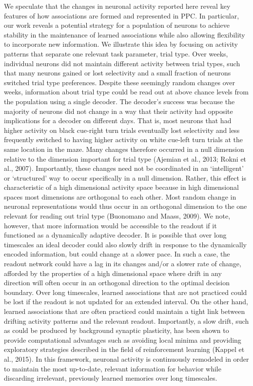 We speculate that the changes in neuronal activity reported here reveal key features of how associations are formed and represented in PPC. In particular, our work reveals a potential strategy for a population of neurons to achieve stability in the maintenance of learned associations while also allowing flexibility to incorporate new information. We illustrate this idea by focusing on activity patterns that separate one relevant task parameter, trial type. Over weeks, individual neurons did not maintain different activity between trial types, such that many neurons gained or lost selectivity and a small fraction of neurons switched trial type preferences. Despite these seemingly random changes over weeks, information about trial type could be read out at above chance levels from the population using a single decoder. The decoder’s success was because the majority of neurons did not change in a way that their activity had opposite implications for a decoder on different days. That is, most neurons that had higher activity on black cue-right turn trials eventually lost selectivity and less frequently switched to having higher activity on white cue-left turn trials at the same location in the maze. Many changes therefore occurred in a null dimension relative to the dimension important for trial type (Ajemian et al., 2013; Rokni et al., 2007). Importantly, these changes need not be coordinated in an ‘intelligent’ or ‘structured’ way to occur specifically in a null dimension. Rather, this effect is characteristic of a high dimensional activity space because in high dimensional spaces most dimensions are orthogonal to each other. Most random change in neuronal representations would thus occur in an orthogonal dimension to the one relevant for reading out trial type (Buonomano and Maass, 2009). We note, however, that more information would be accessible to the readout if it functioned as a dynamically adaptive decoder. It is possible that over long timescales an ideal decoder could also slowly drift in response to the dynamically encoded information, but could change at a slower pace. In such a case, the readout network could have a lag in its changes and/or a slower rate of change, afforded by the properties of a high dimensional space where drift in any direction will often occur in an orthogonal direction to the optimal decision boundary. Over long timescales, learned associations that are not practiced could be lost if the readout is not updated for an extended interval. On the other hand, learned associations that are often practiced could maintain a tight link between drifting activity patterns and the relevant readout. Importantly, a slow drift, such as could be produced by background synaptic plasticity, has been shown to provide computational advantages such as avoiding local minima and providing exploratory strategies described in the field of reinforcement learning (Kappel et al., 2015). In this framework, neuronal activity is continuously remodeled in order to maintain the most up-to-date, relevant information for behavior while discarding irrelevant, previously learned memories over long timescales. 

